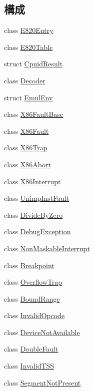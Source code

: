 \subsection*{構成}
\begin{DoxyCompactItemize}
\item 
class \hyperlink{classX86ISA_1_1E820Entry}{E820Entry}
\item 
class \hyperlink{classX86ISA_1_1E820Table}{E820Table}
\item 
struct \hyperlink{structX86ISA_1_1CpuidResult}{CpuidResult}
\item 
class \hyperlink{classX86ISA_1_1Decoder}{Decoder}
\item 
struct \hyperlink{structX86ISA_1_1EmulEnv}{EmulEnv}
\item 
class \hyperlink{classX86ISA_1_1X86FaultBase}{X86FaultBase}
\item 
class \hyperlink{classX86ISA_1_1X86Fault}{X86Fault}
\item 
class \hyperlink{classX86ISA_1_1X86Trap}{X86Trap}
\item 
class \hyperlink{classX86ISA_1_1X86Abort}{X86Abort}
\item 
class \hyperlink{classX86ISA_1_1X86Interrupt}{X86Interrupt}
\item 
class \hyperlink{classX86ISA_1_1UnimpInstFault}{UnimpInstFault}
\item 
class \hyperlink{classX86ISA_1_1DivideByZero}{DivideByZero}
\item 
class \hyperlink{classX86ISA_1_1DebugException}{DebugException}
\item 
class \hyperlink{classX86ISA_1_1NonMaskableInterrupt}{NonMaskableInterrupt}
\item 
class \hyperlink{classX86ISA_1_1Breakpoint}{Breakpoint}
\item 
class \hyperlink{classX86ISA_1_1OverflowTrap}{OverflowTrap}
\item 
class \hyperlink{classX86ISA_1_1BoundRange}{BoundRange}
\item 
class \hyperlink{classX86ISA_1_1InvalidOpcode}{InvalidOpcode}
\item 
class \hyperlink{classX86ISA_1_1DeviceNotAvailable}{DeviceNotAvailable}
\item 
class \hyperlink{classX86ISA_1_1DoubleFault}{DoubleFault}
\item 
class \hyperlink{classX86ISA_1_1InvalidTSS}{InvalidTSS}
\item 
class \hyperlink{classX86ISA_1_1SegmentNotPresent}{SegmentNotPresent}
\item 

\end{DoxyCompactItemize}
